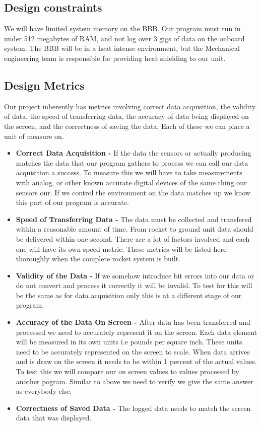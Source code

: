 \documentclass[10pt,draftclsnofoot,onecolumn,compsoc]{IEEEtran}
\begin{document}
\subsection{Design constraints}
We will have limited system memory on the BBB. Our program must run in under 512 megabytes of RAM, and not log over 3 gigs of data on the onboard system. The BBB will be in a heat intense environment, but the Mechanical engineering team is responsible for providing heat shielding to our unit.

\subsection{Design Metrics}
Our project inherently has metrics involving correct data acquisition, the validity of data, the speed of transferring data, the accuracy of data being displayed on the screen, and the correctness of saving the data. Each of these we can place a unit of measure on. \par
\begin{itemize}
\item{\bf Correct Data Acquisition - } If the data the sensors or actually producing matches the data that our program gathers to process we can call our data acquisition a success. To measure this we will have to take measurements with analog, or other known accurate digital devices of the same thing our sensors our. If we control the environment on the data matches up we know this part of our program is accurate. 
\item{\bf Speed of Transferring Data -} The data must be collected and transfered within a reasonable amount of time. From rocket to ground unit data should be delivered within one second. There are a lot of factors involved and each one will have its own speed metric. These metrics will be listed here thoroughly when the complete rocket system is built.
\item{\bf Validity of the Data - } If we somehow introduce bit errors into our data or do not convert and process it correctly it will be invalid. To test for this will be the same as for data acquisition only this is at a different stage of our program.
\item{\bf Accuracy of the Data On Screen - } After data has been transferred and processed we need to accurately represent it on the screen. Each data element will be measured in its own units i.e pounds per square inch. These units need to be accurately represented on the screen to scale. When data arrives and is draw on the screen it needs to be within 1 percent of the actual values. To test this we will compare our on screen values to values processed by another pogram. Similar to above we need to verify we give the same answer as everybody else.
\item{\bf Correctness of Saved Data - } The logged data needs to match the screen data that was displayed.
\end{itemize}
\end{document}
